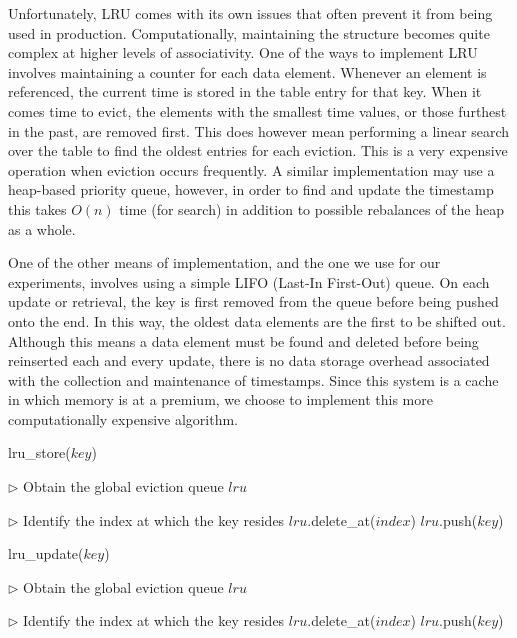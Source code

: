 Unfortunately, LRU comes with its own issues that often prevent it from being
used in production. Computationally, maintaining the structure becomes quite
complex at higher levels of
associativity\cite{zhang_cache_schemes,deville_replacement}. One of the ways
to implement LRU involves maintaining a counter for each data element.
Whenever an element is referenced, the current time is stored in the table
entry for that key. When it comes time to evict, the elements with the smallest
time values, or those furthest in the past, are removed first. This does
however mean performing a linear search over the table to find the oldest
entries for each eviction. This is a very expensive operation when eviction
occurs frequently. A similar implementation may use a heap-based priority
queue, however, in order to find and update the timestamp this takes $O(n)$
time (for search) in addition to possible rebalances of the heap as a whole.

One of the other means of implementation, and the one we use for our
experiments, involves using a simple LIFO (Last-In First-Out) queue. On each
update or retrieval, the key is first removed from the queue before being pushed
onto the end. In this way, the oldest data elements are the first to be shifted
out. Although this means a data element must be found and deleted before being
reinserted each and every update, there is no data storage overhead associated
with the collection and maintenance of timestamps. Since this system is a cache
in which memory is at a premium, we choose to implement this more
computationally expensive algorithm.

\begin{algorithm}[htp]
\small
\caption{\label{alg:lru_store}lru\_store($key$)}
\begin{algorithmic}[1]
\STATE $\triangleright$ Obtain the global eviction queue $lru$

\STATE $\triangleright$ Identify the index at which the key resides
  \STATE $lru$.delete\_at($index$)
\ENDIF
\STATE $lru$.push($key$)
\end{algorithmic}
\end{algorithm}

\begin{algorithm}[htp]
\small
\caption{\label{alg:lru_update}lru\_update($key$)}
\begin{algorithmic}[1]
\STATE $\triangleright$ Obtain the global eviction queue $lru$

\STATE $\triangleright$ Identify the index at which the key resides
  \STATE $lru$.delete\_at($index$)
  \STATE $lru$.push($key$)
\ENDIF
\end{algorithmic}
\end{algorithm}

